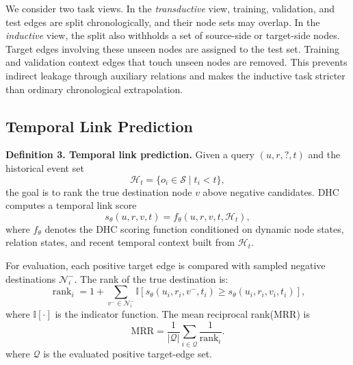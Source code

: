 We consider two task views. In the \emph{transductive} view, training, validation, and test edges are split chronologically, and their node sets may overlap. 
In the \emph{inductive} view, the split also withholds a set of source-side or target-side nodes. Target edges involving these unseen nodes are assigned to the test set. 
Training and validation context edges that touch unseen nodes are removed. This prevents indirect leakage through auxiliary relations and makes the inductive task stricter than ordinary chronological extrapolation.

\subsection{Temporal Link Prediction}

\textbf{Definition 3. Temporal link prediction.}
Given a query $(u,r,?,t)$ and the historical event set
\begin{equation}
\mathcal{H}_t=\{o_i\in\mathcal{S}\mid t_i<t\},
\end{equation}
the goal is to rank the true destination node $v$ above negative candidates. 
DHC computes a temporal link score
\begin{equation}
s_{\theta}(u,r,v,t)=f_{\theta}(u,r,v,t,\mathcal{H}_t),
\end{equation}
where $f_{\theta}$ denotes the DHC scoring function conditioned on dynamic node states, relation states, and recent temporal context built from $\mathcal{H}_t$.

For evaluation, each positive target edge is compared with sampled negative destinations $\mathcal{N}_i^{-}$. 
The rank of the true destination is:
\begin{equation}
\operatorname{rank}_i
=
1+
\sum_{v^{-}\in\mathcal{N}_i^{-}}
\mathbb{I}
\left[
s_{\theta}(u_i,r_i,v^{-},t_i)
\geq
s_{\theta}(u_i,r_i,v_i,t_i)
\right],
\end{equation}
where $\mathbb{I}[\cdot]$ is the indicator function. The mean reciprocal rank(MRR) is
\begin{equation}
\mathrm{MRR}
=
\frac{1}{|\mathcal{Q}|}
\sum_{i\in\mathcal{Q}}
\frac{1}{\operatorname{rank}_i}.
\end{equation}
where $\mathcal{Q}$ is the evaluated positive target-edge set. 


